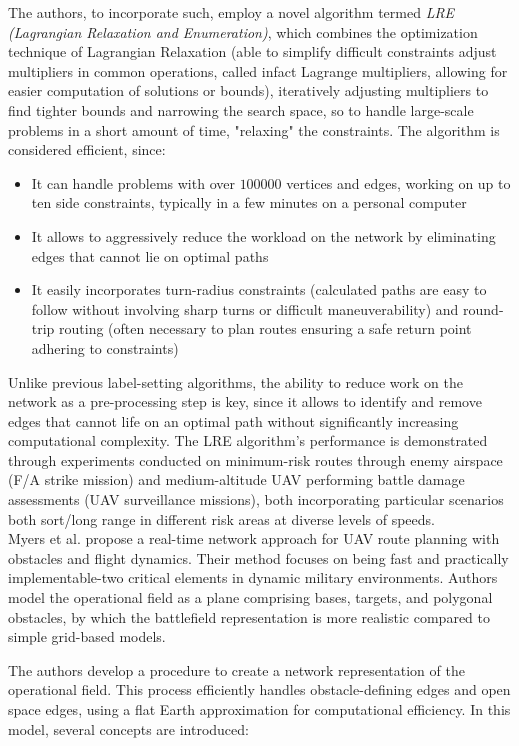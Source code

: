 \documentclass[conference]{IEEEtran}
\begin{document}
The authors, to incorporate such, employ a novel algorithm termed \textit{LRE (Lagrangian Relaxation and Enumeration)}, which combines the optimization technique of Lagrangian Relaxation (able to simplify difficult constraints adjust multipliers in common operations, called infact Lagrange multipliers, allowing for easier computation of solutions or bounds), iteratively adjusting multipliers to find tighter bounds and narrowing the search space, so to handle large-scale problems in a short amount of time, "relaxing" the constraints. The algorithm is considered efficient, since:
\begin{itemize}
    \item It can handle problems with over $100000$ vertices and edges, working on up to ten side constraints, typically in a few minutes on a personal computer
    \item It allows to aggressively reduce the workload on the network by eliminating edges that cannot lie on optimal paths
    \item It easily incorporates turn-radius constraints (calculated paths are easy to follow without involving sharp turns or difficult maneuverability) and round-trip routing (often necessary to plan routes ensuring a safe return point adhering to constraints)
\end{itemize}

Unlike previous label-setting algorithms, the ability to reduce work on the network as a pre-processing step is key, since it allows to identify and remove edges that cannot life on an optimal path without significantly increasing computational complexity. The LRE algorithm's performance is demonstrated through experiments conducted on minimum-risk routes through enemy airspace (F/A strike mission) and medium-altitude UAV performing battle damage assessments (UAV surveillance missions), both incorporating particular scenarios both sort/long range in different risk areas at diverse levels of speeds. \\

Myers et al. \cite{ref2} propose a real-time network approach for UAV route planning with obstacles and flight dynamics. Their method focuses on being fast and practically implementable-two critical elements in dynamic military environments. Authors model the operational field as a plane comprising bases, targets, and polygonal obstacles, by which the battlefield representation is more realistic compared to simple grid-based models.

The authors develop a procedure to create a network representation of the operational field. This process efficiently handles obstacle-defining edges and open space edges, using a flat Earth approximation for computational efficiency. In this model, several concepts are introduced:
\end{document}
